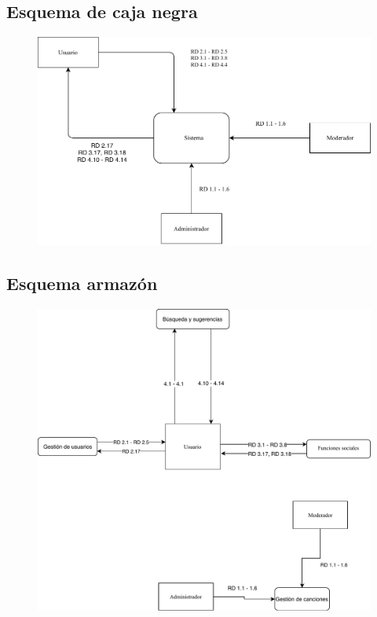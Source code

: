 \subsection{Esquema de caja negra}

\begin{figure}[H]
  \centering
  \includegraphics{diagramas/Caja_negra.pdf}
\end{figure}

\subsection{Esquema armazón}

\begin{figure}[H]
  \centering
  \includegraphics{diagramas/Esquema_armazon.pdf}
\end{figure}

